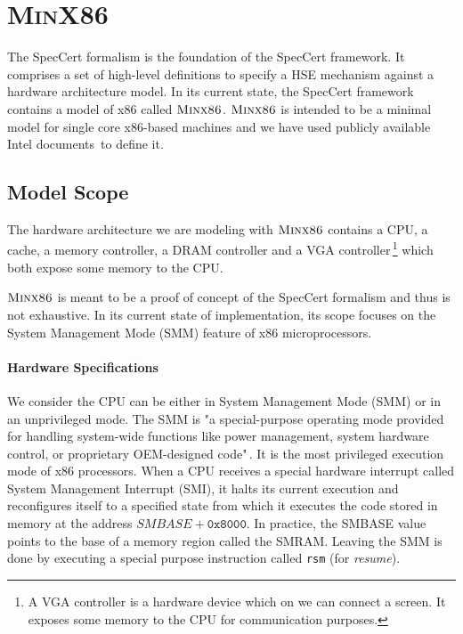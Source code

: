\section{\textsc{MinX86}} \label{sec:speccert:hardware}

The SpecCert formalism is the foundation of the SpecCert framework. It comprises
a set of high-level definitions to specify a HSE mechanism against a hardware
architecture model. In its current state, the SpecCert framework contains a
model of x86 called $\textsc{Minx86}$. $\textsc{Minx86}$ is intended to be
a minimal model for single core x86-based machines and we have used publicly
available Intel documents\,\cite{intel2013celeron,intel2009mch,intel2014manual}
to define it.

\subsection{Model Scope}

The hardware architecture we are modeling with $\textsc{Minx86}$ contains a
CPU, a cache, a memory controller, a DRAM controller and a VGA
controller\,\footnote{A VGA controller is a hardware device which on we can
  connect a screen. It exposes some memory to the CPU for communication
  purposes.}  which both expose some memory to the CPU.

$\textsc{Minx86}$ is meant to be a proof of concept of the SpecCert formalism
and thus is not exhaustive. In its current state of implementation, its scope
focuses on the System Management Mode (SMM) feature of x86 microprocessors.

\paragraph{Hardware Specifications}
We consider the CPU can be either in System Management Mode (SMM) or in an
unprivileged mode. The SMM is "a special-purpose operating mode provided for
handling system-wide functions like power management, system hardware control,
or proprietary OEM-designed code"\,\cite{intel2014manual}. It is the most
privileged execution mode of x86 processors.  When a CPU receives a special
hardware interrupt called System Management Interrupt (SMI), it halts its
current execution and reconfigures itself to a specified state from which it
executes the code stored in memory at the address $SMBASE + \texttt{0x8000}$. In
practice, the SMBASE value points to the base of a memory region called the
SMRAM. Leaving the SMM is done by executing a special purpose instruction called
\texttt{rsm} (for \emph{resume}).

